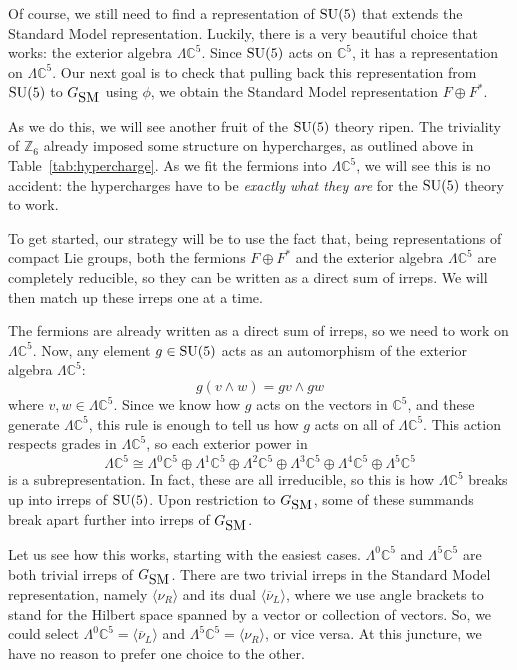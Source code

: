 \documentclass[12pt]{article}
\newcommand{\C}{{\mathbb C}}  %
\newcommand{\Z}{{\mathbb Z}}  %
\newcommand{\SU}{{\rm SU}}    %
\newcommand{\Ex}{\Lambda} %
\newcommand{\iso}{\cong} %
\newcommand{\GSM}{{G_{\mbox{\rm SM}}}}  %
\newcommand{\nubar}{\overline{\nu}} %
\begin{document}
Of course, we still need to find a representation of $\SU(5)$ that extends the 
Standard Model representation.   Luckily, there is a very beautiful choice
that works: the exterior algebra $\Ex \C^5$.
Since $\SU(5)$ acts on $\C^5$, it has a representation on $\Ex \C^5$.
Our next goal is to check that pulling back this representation from
$\SU(5)$ to $\GSM$ using $\phi$, we obtain the Standard Model
representation $F \oplus F^*.$

As we do this, we will see another fruit of the $\SU(5)$ theory ripen. The
triviality of $\Z_6$ already imposed some structure on hypercharges,
as outlined above in Table~\ref{tab:hypercharge}. As we fit the
fermions into $\Ex \C^5$, we will see this is no accident: the
hypercharges have to be \emph{exactly what they are} for the
$\SU(5)$ theory to work.

To get started, our strategy will be to use the fact that, being
representations of compact Lie groups, both the fermions $F \oplus
F^*$ and the exterior algebra $\Ex \C^5$ are completely reducible, 
so they can be written as a direct sum of irreps. We will then match up
these irreps one at a time.

The fermions are already written as a direct sum of irreps, so we need
to work on $\Ex \C^5$. Now, any element $g \in \SU(5)$ acts as an automorphism
of the exterior algebra $\Ex \C^5$:
\[ g(v \wedge w) = gv \wedge gw \]
where $v,w \in \Ex \C^5$. Since we know how $g$ acts on the vectors in $\C^5$,
and these generate $\Ex \C^5$, this rule is enough to tell us how $g$ acts on
all of $\Ex \C^5$. This action respects grades in $\Ex \C^5$, so each
exterior power in
\[ \Ex \C^5 \iso \Ex^0 \C^5 \oplus \Ex^1 \C^5 \oplus \Ex^2 \C^5 \oplus \Ex^3 \C^5 \oplus \Ex^4 \C^5 \oplus \Ex^5 \C^5    \]
is a subrepresentation. In fact, these are all irreducible, so this is
how $\Ex \C^5$ breaks up into irreps of $\SU(5)$.  Upon restriction to $\GSM$,
some of these summands break apart further into irreps of $\GSM$.

Let us see how this works, starting with the easiest cases.  $\Ex^0
\C^5$ and $\Ex^5 \C^5$ are both trivial irreps of $\GSM$.   There
are two trivial irreps in the Standard Model representation, namely 
$\langle \nu_R \rangle$ and its dual $\langle \nubar_L \rangle$,
where we use angle brackets to stand for the Hilbert space spanned by 
a vector or collection of vectors.
So, we could select $\Ex^0 \C^5 = \langle \nubar_L \rangle$ and $\Ex^5
\C^5 = \langle \nu_R \rangle$, or vice versa. At this juncture, we
have no reason to prefer one choice to the other.
\end{document}
